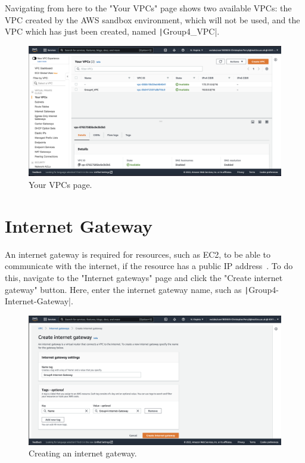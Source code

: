 Navigating from here to the "Your VPCs" page shows two available VPCs: the VPC created by the AWS sandbox
environment, which will not be used, and the VPC which has just been created, named \texttt|Group4_VPC|.

\begin{figure}[!htbp]
    \centering
    \includegraphics[width=\textwidth]{resources/vpc/your_vpcs}
    \caption{Your VPCs page.}
    \label{fig:vpc-step-5}
\end{figure}

\section{Internet Gateway}\label{sec:internet-gateway}

An internet gateway is required for resources, such as EC2, to be able to communicate with the internet, if the resource
has a public IP address~\parencite{amazon2022connect}.
To do this, navigate to the "Internet gateways" page and click the "Create internet gateway" button.
Here, enter the internet gateway name, such as \texttt|Group4-Internet-Gateway|.

\begin{figure}[!htbp]
    \centering
    \includegraphics[width=\textwidth]{resources/vpc/internet-gateway-1}
    \caption{Creating an internet gateway.}
    \label{fig:internet-gateway-1}
\end{figure}

